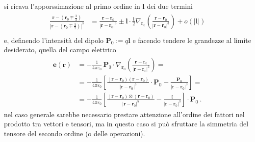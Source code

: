 \documentclass[letterpaper,10pt,italian]{jupyterBook}
\begin{document}
\sphinxAtStartPar
si ricava l’apporssimazione al primo ordine in \(\mathbf{l}\) dei due termini
\begin{equation*}
\begin{split}\begin{aligned}
  \frac{\mathbf{r} - \left( \mathbf{r}_0 \mp \frac{\mathbf{l}}{2} \right)}{\left|\mathbf{r} - \left( \mathbf{r}_0 \mp \frac{\mathbf{l}}{2} \right)\right|^3} 
  & = \frac{\mathbf{r} - \mathbf{r}_0 }{\left|\mathbf{r} - \mathbf{r}_0 \right|^3} \pm \mathbf{l} \cdot \frac{1}{2} \nabla_{\mathbf{r}_0} \left( \frac{\mathbf{r} - \mathbf{r}_0}{|\mathbf{r} - \mathbf{r}_0|^3} \right) + o(|\mathbf{l}|)\\
\end{aligned}\end{split}
\end{equation*}
\sphinxAtStartPar
e, definendo l’intensità del dipolo \(\mathbf{P}_0 := q \mathbf{l}\) e facendo tendere le grandezze al limite desiderato, quella del campo elettrico
\begin{equation*}
\begin{split}\begin{aligned}
  \mathbf{e}(\mathbf{r})
  & = - \frac{1}{4\pi \varepsilon_0} \, \mathbf{P}_0 \cdot \nabla_{\mathbf{r}_0}  \left( \frac{\mathbf{r} - \mathbf{r}_0}{|\mathbf{r} - \mathbf{r}_0|^3} \right)   = \\
  & = - \frac{1}{4\pi \varepsilon_0} \left[ \frac{(\mathbf{r}-\mathbf{r}_0)(\mathbf{r}-\mathbf{r}_0)}{|\mathbf{r}-\mathbf{r}_0|^5} \cdot \mathbf{P}_0 - \frac{\mathbf{P}_0}{|\mathbf{r}-\mathbf{r}_0|^3} \right] = \\
  & = - \frac{1}{4\pi \varepsilon_0} \left[ \frac{(\mathbf{r}-\mathbf{r}_0) \otimes (\mathbf{r}-\mathbf{r}_0)}{|\mathbf{r}-\mathbf{r}_0|^5} - \frac{\mathbb{I}}{|\mathbf{r}-\mathbf{r}_0|^3} \right] \cdot \mathbf{P}_0 \ .
\end{aligned}\end{split}
\end{equation*}
\sphinxAtStartPar
{} nel caso generale sarebbe necessario prestare attenzione all’ordine dei fattori nel prodotto tra vettori e tensori, ma in questo caso si può sfruttare la simmetria del tensore del secondo ordine (o delle operazioni).
\end{document}
